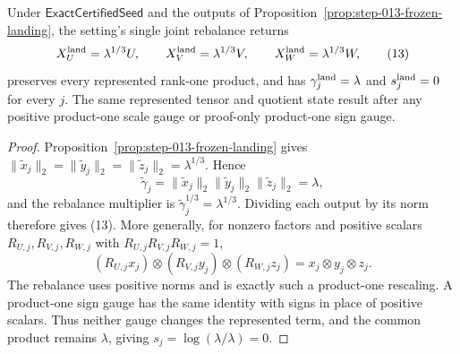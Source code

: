 \begin{proposition}\label{prop:step-013-rebalance-gauge}
Under \(\mathsf{ExactCertifiedSeed}\) and the
outputs of Proposition~\ref{prop:step-013-frozen-landing}, the setting's
single joint rebalance returns
\[
X_U^{\rm land}=\lambda^{1/3}U,\qquad
X_V^{\rm land}=\lambda^{1/3}V,\qquad
X_W^{\rm land}=\lambda^{1/3}W,
\tag{13}
\]
preserves every represented rank-one product, and has
\(\gamma_j^{\rm land}=\lambda\) and \(s_j^{\rm land}=0\) for every \(j\).
The same represented tensor and quotient state result after any positive
product-one scale gauge or proof-only product-one sign gauge.

\begin{proof}
Proposition~\ref{prop:step-013-frozen-landing}
gives \(\|\widetilde x_j\|_2=\|\widetilde y_j\|_2
=\|\widetilde z_j\|_2=\lambda^{1/3}\). Hence
\[
\widetilde\gamma_j
=\|\widetilde x_j\|_2\|\widetilde y_j\|_2\|\widetilde z_j\|_2
=\lambda,
\tag{14}
\]
and the rebalance multiplier is \(\widetilde\gamma_j^{1/3}
=\lambda^{1/3}\). Dividing each output by its norm therefore gives (13).
More generally, for nonzero factors and positive scalars
\(R_{U,j},R_{V,j},R_{W,j}\) with
\(R_{U,j}R_{V,j}R_{W,j}=1\),
\[
(R_{U,j}x_j)\otimes(R_{V,j}y_j)\otimes(R_{W,j}z_j)
=x_j\otimes y_j\otimes z_j.
\tag{15}
\]
The rebalance uses positive norms and is exactly such a product-one
rescaling. A product-one sign gauge has the same identity with signs in
place of positive scalars. Thus neither gauge changes the represented term,
and the common product remains \(\lambda\), giving
\(s_j=\log(\lambda/\lambda)=0\).



\end{proof}
\end{proposition}
